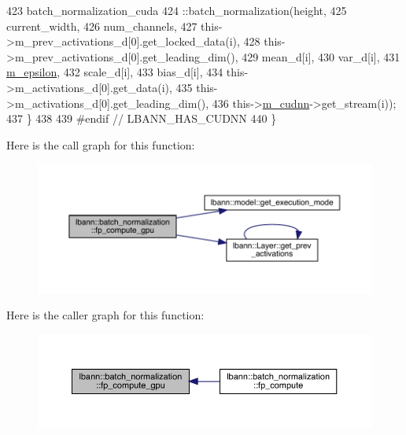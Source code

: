 \begin{DoxyCode}
423       batch\_normalization\_cuda
424         ::batch\_normalization(height,
425                               current\_width,
426                               num\_channels,
427                               this->m\_prev\_activations\_d[0].get\_locked\_data(i),
428                               this->m\_prev\_activations\_d[0].get\_leading\_dim(),
429                               mean\_d[i],
430                               var\_d[i],
431                               \hyperlink{classlbann_1_1batch__normalization_ab82e74f905b7a117d9940f8542451e37}{m\_epsilon},
432                               scale\_d[i],
433                               bias\_d[i],
434                               this->m\_activations\_d[0].get\_data(i),
435                               this->m\_activations\_d[0].get\_leading\_dim(),
436                               this->\hyperlink{classlbann_1_1Layer_a08dbb94239e3b8c96329786c57c72e21}{m\_cudnn}->get\_stream(i));
437     \}
438 
439 \textcolor{preprocessor}{  #endif // LBANN\_HAS\_CUDNN}
440   \}
\end{DoxyCode}
Here is the call graph for this function\+:\nopagebreak
\begin{figure}[H]
\begin{center}
\leavevmode
\includegraphics[width=350pt]{classlbann_1_1batch__normalization_aacff2c47a5455a4c28b9695f4fb37249_cgraph}
\end{center}
\end{figure}
Here is the caller graph for this function\+:\nopagebreak
\begin{figure}[H]
\begin{center}
\leavevmode
\includegraphics[width=350pt]{classlbann_1_1batch__normalization_aacff2c47a5455a4c28b9695f4fb37249_icgraph}
\end{center}
\end{figure}
\mbox{\label{classlbann_1_1batch__normalization_ac97c038b9dec333a7fb285c196429e2d}} 
